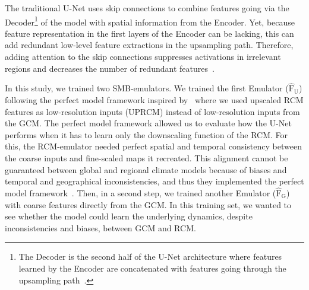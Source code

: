 \documentclass[a4paper,11pt,oneside]{report}
\begin{document}
\begin{itemize}
    The traditional U-Net uses skip connections to combine features going via the Decoder\footnote{The Decoder is the second half of the U-Net architecture where features learned by the Encoder are concatenated with features going through the upsampling path~\cite{Encoder}.} of the model with spatial information from the Encoder. Yet, because feature representation in the first layers of the Encoder can be lacking, this can add redundant low-level feature extractions in the upsampling path. Therefore, adding attention to the skip connections suppresses activations in irrelevant regions and decreases the number of redundant features~\cite{AttentionUNet}.
    
    In this study, we trained two SMB-emulators. We trained the first Emulator ($\operatorname{\mathrm{\hat{F}_U}}$) following the perfect model framework inspired by~\cite{Doury} where we used upscaled RCM features as low-resolution inputs (UPRCM) instead of low-resolution inputs from the GCM. The perfect model framework allowed us to evaluate how the U-Net performs when it has to learn only the downscaling function of the RCM. For this, the RCM-emulator needed perfect spatial and temporal consistency between the coarse inputs and fine-scaled maps it recreated. This alignment cannot be guaranteed between global and regional climate models because of biases and temporal and geographical inconsistencies, and thus they implemented the perfect model framework~\cite{Doury, Sanchez2009, Sanchez2018}. Then, in a second step, we trained another Emulator ($\operatorname{\mathrm{\hat{F}_G}}$) with coarse features directly from the GCM. In this training set, we wanted to see whether the model could learn the underlying dynamics, despite inconsistencies and biases, between GCM and RCM. 
    
    

    

\end{itemize}
\end{document}

